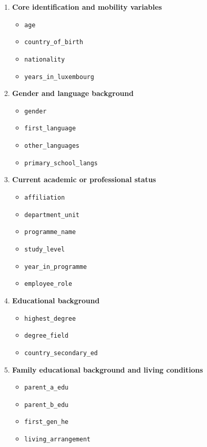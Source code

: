 \begin{enumerate}
    \item \textbf{Core identification and mobility variables}
    \begin{itemize}
        \item \texttt{age}
        \item \texttt{country\_of\_birth}
        \item \texttt{nationality}
        \item \texttt{years\_in\_luxembourg}
    \end{itemize}

    \item \textbf{Gender and language background}
    \begin{itemize}
        \item \texttt{gender}
        \item \texttt{first\_language}
        \item \texttt{other\_languages}
        \item \texttt{primary\_school\_langs}
    \end{itemize}

    \item \textbf{Current academic or professional status}
    \begin{itemize}
        \item \texttt{affiliation}
        \item \texttt{department\_unit}
        \item \texttt{programme\_name}
        \item \texttt{study\_level}
        \item \texttt{year\_in\_programme}
        \item \texttt{employee\_role}
    \end{itemize}

    \item \textbf{Educational background}
    \begin{itemize}
        \item \texttt{highest\_degree}
        \item \texttt{degree\_field}
        \item \texttt{country\_secondary\_ed}
    \end{itemize}

    \item \textbf{Family educational background and living conditions}
    \begin{itemize}
        \item \texttt{parent\_a\_edu}
        \item \texttt{parent\_b\_edu}
        \item \texttt{first\_gen\_he}
        \item \texttt{living\_arrangement}
    \end{itemize}
\end{enumerate}

